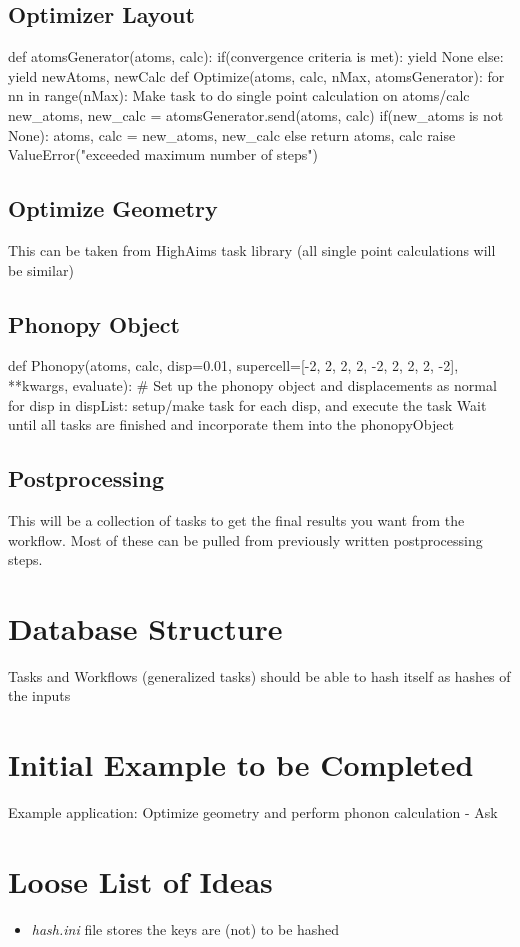 \documentclass [notitlepage, 12pt, a4paper]{article}
\begin{document}
\subsection{Optimizer Layout}
\begin{python}
def atomsGenerator(atoms, calc):
    if(convergence criteria is met):
        yield None
    else:
        yield newAtoms, newCalc
def Optimize(atoms, calc, nMax, atomsGenerator):
    for nn in range(nMax):
        Make task to do single point calculation on atoms/calc
        new_atoms, new_calc = atomsGenerator.send(atoms, calc)
        if(new_atoms is not None):
            atoms, calc = new_atoms, new_calc
        else
            return atoms, calc
    raise ValueError("exceeded maximum number of steps")
\end{python}

\subsection{Optimize Geometry}
This can be taken from HighAims task library (all single point calculations will be similar)

\subsection{Phonopy Object}
\begin{python}
def Phonopy(atoms, calc, {disp=0.01,
            supercell=[-2, 2, 2, 2, -2, 2, 2, 2, -2], **kwargs},
            evaluate):
    # Set up the phonopy object and displacements as normal
    for disp in dispList:
        setup/make task for each disp, and execute the task
    Wait until all tasks are finished and incorporate them into the
    phonopyObject
\end{python}

\subsection{Postprocessing}
This will be a collection of tasks to get the final results you want from the workflow.
Most of these can be pulled from previously written postprocessing steps.

\section{Database Structure}
Tasks and Workflows (generalized tasks) should be able to hash itself as hashes of the inputs

\section{Initial Example to be Completed}
Example application: Optimize geometry and perform phonon calculation
- Ask

\section{Loose List of Ideas}
\begin{itemize}
    \item \emph{hash.ini} file stores the keys are (not) to be hashed
\end{itemize}
\end{document}
